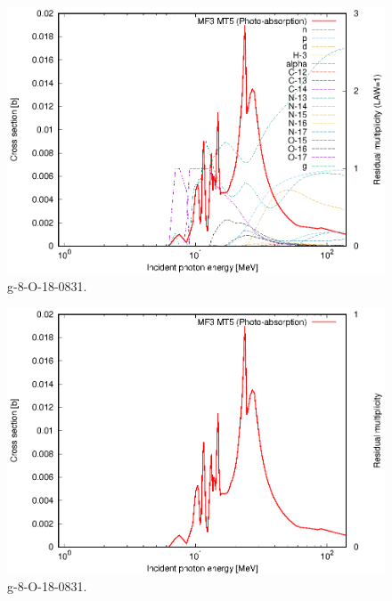 \begin{figure}
 \includegraphics[width=\linewidth]{eps/g_8-O-18_0831.eps}
  \caption{g-8-O-18-0831.}
\end{figure}
\begin{figure}
 \includegraphics[width=\linewidth]{eps-law0/g_8-O-18_0831.eps}
 \caption{g-8-O-18-0831.}
\end{figure}
\newpage \clearpage

